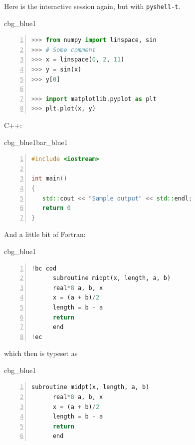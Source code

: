 \documentclass[%
oneside,                 %
final,                   %
10pt]{article}
\newenvironment{_cod_tight}[1]{
   \def\FrameCommand{\colorbox{#1}}
   \FrameRule0.6pt\MakeFramed {\FrameRestore}\vskip3mm}
   {\vskip0mm\endMakeFramed}
\newenvironment{cod}[1]{
\bgroup\rmfamily
\fboxsep=0mm\relax
\begin{_cod_tight}{#1}
\list{}{\parsep=-2mm\parskip=0mm\topsep=0pt\leftmargin=2mm
\rightmargin=2\leftmargin\leftmargin=4pt\relax}
\item\relax}
{\endlist\end{_cod_tight}\egroup}
\newenvironment{_pro_tight}[2]{
   \def\FrameCommand{\color{#2}\vrule width 1mm\normalcolor\colorbox{#1}}
   \FrameRule0.6pt\MakeFramed {\advance\hsize-2mm\FrameRestore}\vskip3mm}
   {\vskip0mm\endMakeFramed}
\newenvironment{pro}[2]{
\bgroup\rmfamily
\fboxsep=0mm\relax
\begin{_pro_tight}{#1}{#2}
\list{}{\parsep=-2mm\parskip=0mm\topsep=0pt\leftmargin=2mm
\rightmargin=2\leftmargin\leftmargin=4pt\relax}
\item\relax}
{\endlist\end{_pro_tight}\egroup}
\theoremstyle{definition}
\begin{document}
Here is the interactive session again, but with \texttt{pyshell-t}.
\begin{cod}{cbg_blue1}\begin{lstlisting}[language=Python,style=myspeciallststyle,numbers=left,numberstyle=\tiny,stepnumber=3,numbersep=15pt,xleftmargin=1mm]
>>> from numpy import linspace, sin
>>> # Some comment
>>> x = linspace(0, 2, 11)
>>> y = sin(x)
>>> y[0]

>>> import matplotlib.pyplot as plt
>>> plt.plot(x, y)

\end{lstlisting}\end{cod}
\noindent

C++:
\begin{pro}{cbg_blue1}{bar_blue1}\begin{lstlisting}[language=C++,style=myspeciallststyle,numbers=left,numberstyle=\tiny,stepnumber=3,numbersep=15pt,xleftmargin=1mm]
#include <iostream>

int main()
{
   std::cout << "Sample output" << std::endl;
   return 0
}

\end{lstlisting}\end{pro}
\noindent

And a little bit of Fortran: 
\begin{cod}{cbg_blue1}\begin{lstlisting}[language=Python,style=myspeciallststyle,numbers=left,numberstyle=\tiny,stepnumber=3,numbersep=15pt,xleftmargin=1mm]
!bc cod
      subroutine midpt(x, length, a, b)
      real*8 a, b, x
      x = (a + b)/2
      length = b - a
      return
      end
!ec

\end{lstlisting}\end{cod}
\noindent

which then is typeset as
\begin{cod}{cbg_blue1}\begin{lstlisting}[language=Python,style=myspeciallststyle,numbers=left,numberstyle=\tiny,stepnumber=3,numbersep=15pt,xleftmargin=1mm]
      subroutine midpt(x, length, a, b)
      real*8 a, b, x
      x = (a + b)/2
      length = b - a
      return
      end

\end{lstlisting}\end{cod}
\noindent
\end{document}
